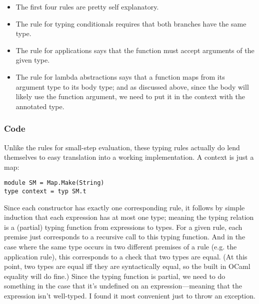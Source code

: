 \message{ !name(report.tex)}\documentclass[pageno]{jpaper}
\begin{document}
{\begin{prooftree}
\end{prooftree}

\begin{prooftree}
\end{prooftree}

\begin{prooftree}
\end{prooftree}

\begin{itemize}
\item The first four rules are pretty self explanatory.
\item The rule for typing conditionals requires that both branches have the same type.
\item The rule for applications says that the function must accept arguments of the given type.
\item The rule for lambda abstractions says that a function maps from its argument type to its body type; and
as discussed above, since the body will likely use the function argument, we need to put it
in the context with the annotated type.
\end{itemize}

\subsubsection{Code}
Unlike the rules for small-step evaluation, these typing rules actually do lend themselves to
easy translation into a working implementation. A context is just a map:
\begin{lstlisting}
module SM = Map.Make(String)
type context = typ SM.t
\end{lstlisting}

Since each constructor has exactly one corresponding rule, it follows by simple induction that
each expression has at most one type; meaning the typing relation is a (partial) typing function from expressions
to types. For a given rule, each premise just corresponds to a recursive call to this typing
function. And in the case where the same type occurs in two different premises of a rule (e.g. the application rule), this corresponds to a check that two types are equal. (At this point, two types are equal iff they are
syntactically equal, so the built in OCaml equality will do fine.)
Since the typing function is partial, we need to do something in the case that it's undefined on
an expression---meaning that the expression isn't well-typed.  I found it most convenient just to throw an
exception.

}
\end{document}
